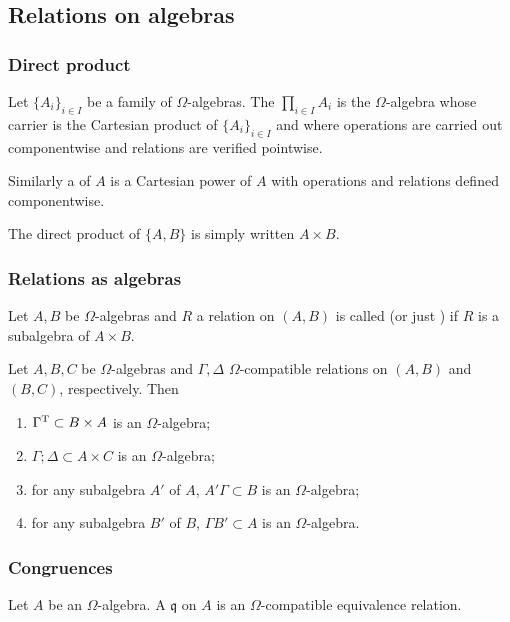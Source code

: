 \subsection{Relations on algebras}
\subsubsection{Direct product}
\begin{definition}
Let $\{A_i\}_{i\in I}$ be a family of $\Omega$-algebras. The  $\prod_{i\in I} A_i$ is the $\Omega$-algebra whose carrier is the Cartesian product of $\{A_i\}_{i\in I}$ and where operations are carried out componentwise and relations are verified pointwise.

Similarly a  of $A$ is a Cartesian power of $A$ with operations and relations defined componentwise.
\end{definition}

The direct product of $\{A,B\}$ is simply written $A\times B$.

\subsubsection{Relations as algebras}
\begin{definition}
Let $A,B$ be $\Omega$-algebras and $R$ a relation on $(A,B)$ is called  (or just ) if $R$ is a subalgebra of $A\times B$.
\end{definition}

\begin{lemma}
Let $A,B,C$ be $\Omega$-algebras and $\Gamma, \Delta$ $\Omega$-compatible relations on $(A, B)$ and $(B, C)$, respectively. Then
\begin{enumerate}
\item $\Gamma^{\mathrm{T}} \subset B\times A$ is an $\Omega$-algebra;
\item $\Gamma;\Delta \subset A\times C$ is an $\Omega$-algebra;
\item for any subalgebra $A'$ of $A$, $A'\Gamma \subset B$ is an $\Omega$-algebra;
\item for any subalgebra $B'$ of $B$, $\Gamma B' \subset A$ is an $\Omega$-algebra.
\end{enumerate}
\end{lemma}

\subsubsection{Congruences}
\begin{definition}
Let $A$ be an $\Omega$-algebra. A  $\mathfrak{q}$ on $A$ is an $\Omega$-compatible equivalence relation.
\end{definition}

